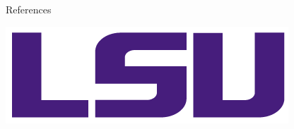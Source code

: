 \documentclass[final]{beamer}
\newlength{\onecolwid}
\begin{document}
\begin{frame}[t]
\begin{columns}[t]
\begin{column}{\onecolwid}
\begin{block}{References}
{\begin{thebibliography}{99}
\end{thebibliography}
}
\end{block}

\centering
\vspace{1cm}
\includegraphics[width=.5\linewidth]{LSU_Purple_RGB.png} 






\end{column} %

\end{columns} %

\end{frame} %
\end{document}
